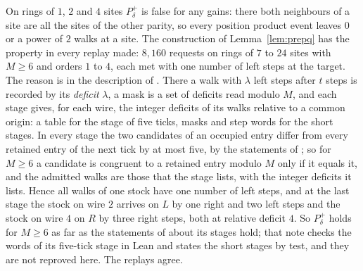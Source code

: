On rings of $1$, $2$ and $4$ sites $P^{+}_\delta$ is false for any gains: there both neighbours of a site are all the sites of the other parity, so every position product event leaves $0$ or a power of $2$ walks at a site. The construction of Lemma~\ref{lem:prepq} has the property in every replay made: $8{,}160$ requests on rings of $7$ to $24$ sites with $M\ge6$ and orders $1$ to $4$, each met with one number of left steps at the target. The reason is in the description of \cite{dgone}. There a walk with $\lambda$ left steps after $t$ steps is recorded by its \emph{deficit} $\lambda$, a mask is a set of deficits read modulo $M$, and each stage gives, for each wire, the integer deficits of its walks relative to a common origin: a table for the stage of five ticks, masks and step words for the short stages. In every stage the two candidates of an occupied entry differ from every retained entry of the next tick by at most five, by the statements of \cite{dgone}; so for $M\ge6$ a candidate is congruent to a retained entry modulo $M$ only if it equals it, and the admitted walks are those that the stage lists, with the integer deficits it lists. Hence all walks of one stock have one number of left steps, and at the last stage the stock on wire $2$ arrives on $L$ by one right and two left steps and the stock on wire $4$ on $R$ by three right steps, both at relative deficit $4$. So $P^{+}_\delta$ holds for $M\ge6$ as far as the statements of \cite{dgone} about its stages hold; that note checks the words of its five-tick stage in Lean and states the short stages by test, and they are not reproved here. The replays agree.

